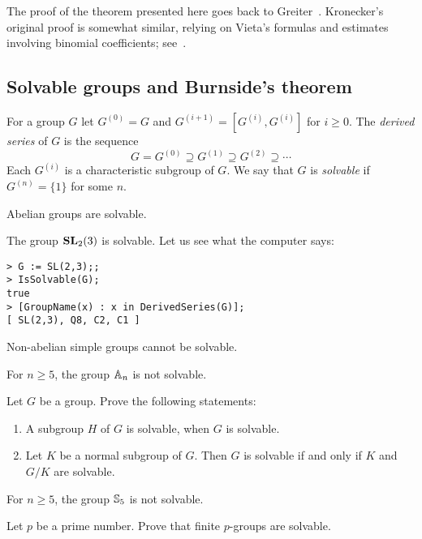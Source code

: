 The proof of the theorem presented here goes back to Greiter~\cite{MR514044}. 
Kronecker’s original proof is somewhat similar, relying on 
Vieta’s formulas and estimates involving binomial coefficients; see~\cite{MR1834706}.


\subsection{Solvable groups and Burnside's theorem}

For a group $G$ let 
$G^{(0)}=G$ and 
$G^{(i+1)}=[G^{(i)},G^{(i)}]$ for $i\geq0$.
The \emph{derived series} of $G$ is the sequence
\[
G=G^{(0)}\supseteq G^{(1)}\supseteq G^{(2)}\supseteq\cdots
\]
Each $G^{(i)}$ is a characteristic subgroup of $G$. We say that 
$G$ is \emph{solvable} if $G^{(n)}=\{1\}$ for some $n$.  

\begin{example}
	Abelian groups are solvable. 
\end{example}

\begin{example}
	The group $\mathbf{SL}_2(3)$ is solvable. 
	Let us see what the computer says:
\begin{lstlisting}
> G := SL(2,3);;
> IsSolvable(G);
true
> [GroupName(x) : x in DerivedSeries(G)];
[ SL(2,3), Q8, C2, C1 ]
\end{lstlisting}
\end{example}

\begin{example}
	Non-abelian simple groups cannot be solvable. 
\end{example}

For $n\geq5$, the group $\mathbb{A}_n$ is not solvable.

\begin{exercise}
	\label{xca:solvable}
	Let $G$ be a group. Prove the following statements:
	\begin{enumerate}
		\item A subgroup $H$ of $G$ is solvable, when $G$ is solvable.
		\item Let $K$ be a normal subgroup of $G$. 
		    Then $G$ is solvable if and only if $K$ and $G/K$ are solvable.
	\end{enumerate}
\end{exercise}

For $n\geq5$, the group $\mathbb{S}_5$ is not solvable. 

\begin{exercise}
\label{xca:pgroups_solvable}
	Let $p$ be a prime number. Prove that 
	finite $p$-groups are solvable.
\end{exercise}


